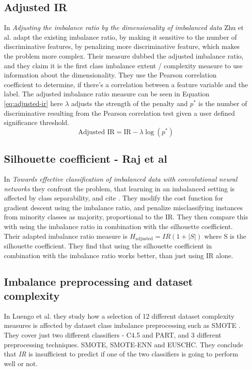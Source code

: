 \subsection*{Adjusted IR}
In \emph{Adjusting the imbalance ratio by the dimensionality of imbalanced data} \cite{DBLP:journals/prl/ZhuGX20} Zhu et al. adapt the existing imbalance ratio, by making it sensitive to the number of discriminative features, by penalizing more discriminative feature, which makes the problem more complex. Their measure dubbed the adjusted imbalance ratio, and they claim it is the first class imbalance extent / complexity measure to use information about the dimensionality. They use the Pearson correlation coefficient to determine, if there's a correlation between a feature variable and the label. The adjusted imbalance ratio measure can be seen in Equation  \ref{eq:adjusted-ir} here $\lambda$ adjusts the strength of the penalty and $p^*$ is the number of discriminative resulting from the Pearson correlation test given a user defined significance threshold. 
\begin{equation}
    \label{eq:adjusted-ir}
    \text{Adjusted IR} = \text{IR}-\lambda \log(p^*)
\end{equation}


\subsection*{Silhouette coefficient - Raj et al}
In \emph{Towards effective classification of imbalanced data with convolutional neural networks} \cite{raj2016towards} they confront the problem, that learning in an imbalanced setting is affected by class separability, and cite \cite{DBLP:journals/apin/MurpheyGF04}. They modify the cost function for gradient descent using the imbalance ratio, and penalize misclassifying instances from minority classes as majority, proportional to the IR. They then compare this with using the imbalance ratio in combination with the silhouette coefficient. Their adapted imbalance ratio measure is $H_\text{adjusted}=IR(1+|S|)$ where S is the silhouette coefficient. They find that using the silhouette coefficient in combination with the imbalance ratio works better, than just using IR alone.

\subsection*{Imbalance preprocessing and dataset complexity}
In Luengo et al. \cite{luengo2011addressing} they study how a selection of 12 different dataset complexity measures is affected by dataset class imbalance preprocessing such as SMOTE \cite{DBLP:journals/jair/ChawlaBHK02}. They cover just two different classifiers - C4.5\cite{DBLP:books/mk/Quinlan93} and PART, and 3 different preprocessing techniques. SMOTE, SMOTE-ENN and EUSCHC. They conclude that \emph{IR} is insufficient to predict if one of the two classifiers is going to perform well or not.

